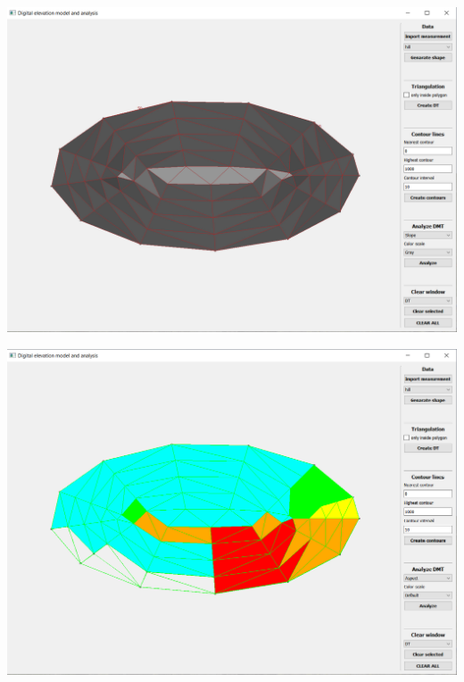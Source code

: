 \documentclass[12pt]{article}
\begin{document}
\begin{center}
   \includegraphics[width=14cm]{./img/hill_slope.png}
\end{center}

\begin{center}
   \includegraphics[width=14cm]{./img/hill_aspect.png}
\end{center}
\end{document}
